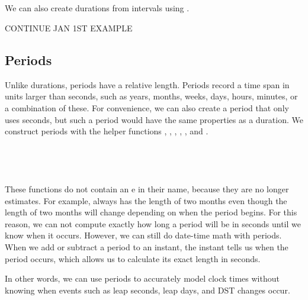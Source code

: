 \documentclass[article]{jss}
\begin{document}
\\
\\
\\
\\

We can also create durations from intervals using . 

CONTINUE JAN 1ST EXAMPLE

\subsection{Periods}
\label{sec:periods}

Unlike durations, periods have a relative length. Periods record a time span in units larger than seconds, such as years, months, weeks, days, hours, minutes, or a combination of these. For convenience, we can also create a period that only uses seconds, but such a period would have the same properties as a duration. We construct periods with the helper functions , , , , , and  .\\

\\
\\

\\
\\

These functions do not contain an e in their name, because they are no longer estimates. For example,  always has the length of two months even though the length of two months will change depending on when the period begins. For this reason, we can not compute exactly how long a period will be in seconds until we know when it occurs. However, we can still do date-time math with periods. When we add or subtract a period to an instant, the instant tells us when the period occurs, which allows us to calculate its exact length in seconds. 

In other words, we can use periods to accurately model clock times without knowing when events such as leap seconds, leap days, and DST changes occur.

\\
\\
\\
\\
\end{document}
